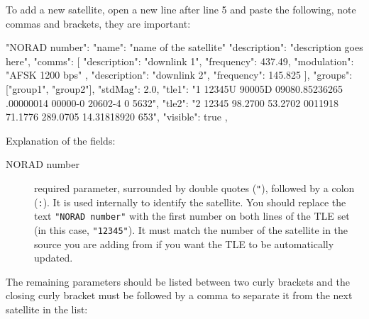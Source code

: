
To add a new satellite, open a new line after line 5 and paste the following, note commas and brackets, they are important:
\begin{configfile}[\scriptsize]
"NORAD number": 
{
  "name": "name of the satellite"
  "description": "description goes here",
  "comms": [
     {
  	"description": "downlink 1",
  	"frequency": 437.49,
  	"modulation": "AFSK 1200 bps"
     },
     {
  	"description": "downlink 2",
  	"frequency": 145.825
     }
  ],
  "groups": ["group1", "group2"],
  "stdMag": 2.0,
  "tle1": "1 12345U 90005D   09080.85236265  .00000014  00000-0  20602-4 0  5632",
  "tle2": "2 12345 98.2700  53.2702 0011918  71.1776 289.0705 14.31818920   653",
  "visible": true
},
\end{configfile}
Explanation of the fields:

\begin{description}
\item[NORAD number]  required parameter, surrounded by double quotes (\texttt{"}),
followed by a colon (\texttt{:}). It is used internally to identify the
satellite. You should replace the text \texttt{"NORAD number"} with the first number on both lines of the TLE set (in this case, \texttt{"12345"}). It must match the number of the satellite in the source you are adding from if you want the TLE to be automatically updated.
\end{description}
The remaining parameters should be listed between two curly brackets and the closing curly bracket must be followed by a comma to separate it from the next satellite in the list:

